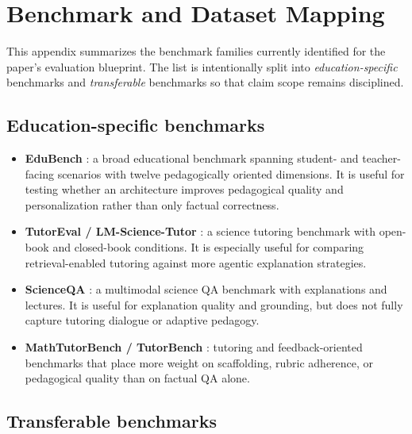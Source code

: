 \appendix

\section{Benchmark and Dataset Mapping}

This appendix summarizes the benchmark families currently identified for the paper's evaluation blueprint. The list is intentionally split into \emph{education-specific} benchmarks and \emph{transferable} benchmarks so that claim scope remains disciplined.

\subsection{Education-specific benchmarks}

\begin{itemize}[leftmargin=*]
    \item \textbf{EduBench} \cite{xu2025edubench}: a broad educational benchmark spanning student- and teacher-facing scenarios with twelve pedagogically oriented dimensions. It is useful for testing whether an architecture improves pedagogical quality and personalization rather than only factual correctness.
    \item \textbf{TutorEval / LM-Science-Tutor} \cite{chevalier2024sciencetutors}: a science tutoring benchmark with open-book and closed-book conditions. It is especially useful for comparing retrieval-enabled tutoring against more agentic explanation strategies.
    \item \textbf{ScienceQA} \cite{lu2022scienceqa}: a multimodal science QA benchmark with explanations and lectures. It is useful for explanation quality and grounding, but does not fully capture tutoring dialogue or adaptive pedagogy.
    \item \textbf{MathTutorBench / TutorBench} \cite{macina2025mathtutorbench,srinivasa2025tutorbench}: tutoring and feedback-oriented benchmarks that place more weight on scaffolding, rubric adherence, or pedagogical quality than on factual QA alone.
\end{itemize}

\subsection{Transferable benchmarks}

